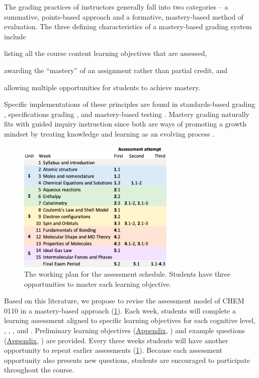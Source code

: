 \documentclass[10pt,letterpaper]{article}
\begin{document}
The grading practices of instructors generally fall into two categories -- a summative, points-based approach and a formative, mastery-based method of evaluation. The three defining characteristics of a mastery-based grading system include   \citep{Kelly2020} \begin{enumerate*}[label=\textbf{\arabic*).},nosep]
\item listing all the course content learning objectives that are assessed, 
\item awarding the
  ``mastery'' of an assignment rather than partial credit, and
  \item allowing multiple opportunities for students to achieve mastery.
\end{enumerate*}
Specific implementations of these principles are found in standards-based grading \citep{Marzano2011}, specifications grading \citep{Nilson2015}, and mastery-based testing \citep{Collins2019}. Mastery grading naturally fits with guided inquiry instruction since both are ways of promoting a growth mindset by treating knowledge and learning as an evolving process \cite{selbach2020}.

%
%

\begin{figure}
\includegraphics[width=7.5cm]{schedule.png}
\caption{\label{fig:schedule}
The working plan for the assessment schedule. Students have three opportunities to master each learning objective.}
\end{figure}

Based on this literature, we propose to revise the assessment model of CHEM 0110 in a mastery-based approach (\cref{fig:schedule}). Each week, students will complete a learning assessment aligned to specific learning objectives for each cognitive level, \recall, \comprehension, \analysis, and \use. Preliminary learning objectives (\hyperref[app:learning_objectives]{Appendix}, ) and example questions (\hyperref[app:example_questions]{Appendix}, ) are provided. Every three weeks students will have another opportunity to repeat earlier assessments (\cref{fig:schedule}). Because each assessment opportunity also presents new questions, students are encouraged to participate throughout the course.
\end{document}
